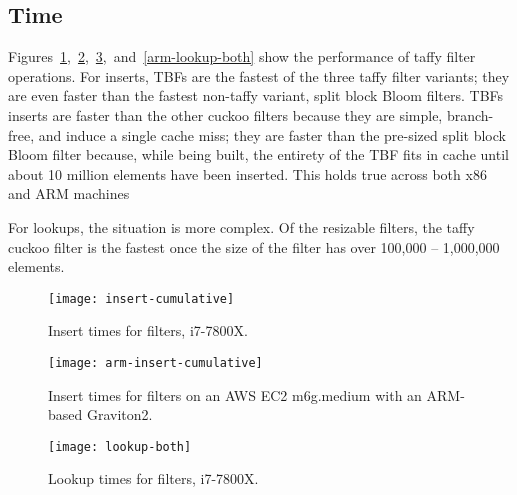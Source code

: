 \documentclass[sigconf]{acmart}
\begin{document}


\subsection{Time}

Figures~\ref{insert-time},~\ref{arm-insert-time},~\ref{lookup-both},~and~\ref{arm-lookup-both} show the performance of taffy filter operations.
For inserts, TBFs are the fastest of the three taffy filter variants; they are even faster than the fastest non-taffy variant, split block Bloom filters.
TBFs inserts are faster than the other cuckoo filters because they are simple, branch-free, and induce a single cache miss; they are faster than the pre-sized split block Bloom filter because, while being built, the entirety of the TBF fits in cache until about 10 million elements have been inserted.
This holds true across both x86 and ARM machines

For lookups, the situation is more complex.
Of the resizable filters, the taffy cuckoo filter is the fastest once the size of the filter has over 100,000 -- 1,000,000 elements.

\begin{figure}
  \texttt{[image: insert-cumulative]}
  \caption{
    \label{insert-time}
    Insert times for filters, i7-7800X.
  }
\end{figure}

\begin{figure}
  \texttt{[image: arm-insert-cumulative]}
  \caption{
    \label{arm-insert-time}
    Insert times for filters on an AWS EC2 m6g.medium with an ARM-based Graviton2.
  }
\end{figure}

\begin{figure}
  \texttt{[image: lookup-both]}
  \caption{
    \label{lookup-both}
    Lookup times for filters, i7-7800X.
  }
\end{figure}
\end{document}
